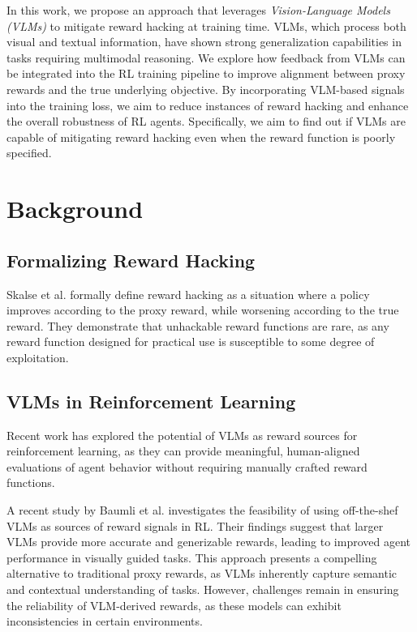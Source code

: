 \documentclass{article}
\begin{document}
In this work, we propose an approach that leverages \textit{Vision-Language Models (VLMs)} to mitigate reward hacking at training time. VLMs, which process both visual and textual information, have shown strong generalization capabilities in tasks requiring multimodal reasoning. We explore how feedback from VLMs can be integrated into the RL training pipeline to improve alignment between proxy rewards and the true underlying objective. By incorporating VLM-based signals into the training loss, we aim to reduce instances of reward hacking and enhance the overall robustness of RL agents. Specifically, we aim to find out if VLMs are capable of mitigating reward hacking even when the reward function is poorly specified. 

\section{Background}
\subsection{Formalizing Reward Hacking}
Skalse et al. \cite{skalse2022definingcharacterizingrewardhacking} formally define reward hacking as a situation where a policy improves according to the proxy reward, while worsening according to the true reward. They demonstrate that unhackable reward functions are rare, as any reward function designed for practical use is susceptible to some degree of exploitation. 

\subsection{VLMs in Reinforcement Learning}
Recent work has explored the potential of VLMs as reward sources for reinforcement learning, as they can provide meaningful, human-aligned evaluations of agent behavior without requiring manually crafted reward functions.

A recent study by Baumli et al. \cite{baumli2024visionlanguagemodelssourcerewards} investigates the feasibility of using off-the-shef VLMs as sources of reward signals in RL. Their findings suggest that larger VLMs provide more accurate and generizable rewards, leading to improved agent performance in visually guided tasks. This approach presents a compelling alternative to traditional proxy rewards, as VLMs inherently capture semantic and contextual understanding of tasks. However, challenges remain in ensuring the reliability of VLM-derived rewards, as these models can exhibit inconsistencies in certain environments.
\end{document}
